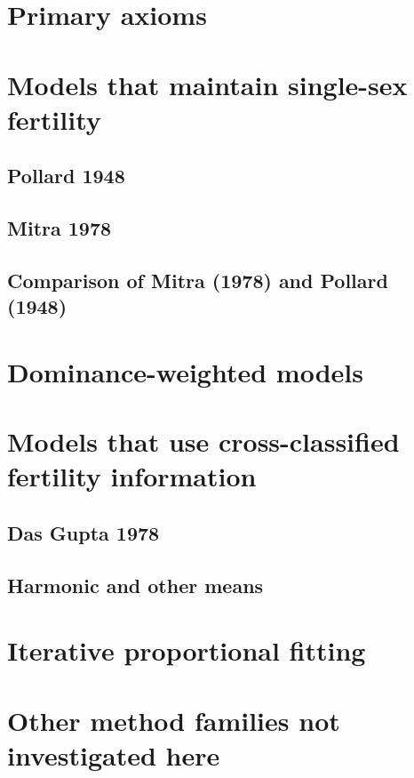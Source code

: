     \section{Primary axioms}
      
    \section{Models that maintain single-sex fertility}
      \subsection{Pollard 1948}
       
      \subsection{Mitra 1978}
        
      \subsection{Comparison of Mitra (1978) and Pollard (1948)}
       
  \section{Dominance-weighted models}
     
  \section{Models that use cross-classified fertility information}
     \subsection{Das Gupta 1978}
       
     \subsection{Harmonic and other means}
       
     

  \section{Iterative proportional fitting}
      
  \section{Other method families not investigated here}
     


